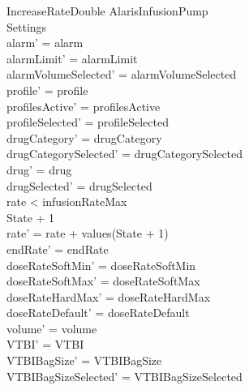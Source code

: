 \begin{schema}{IncreaseRateDouble}
	\Delta AlarisInfusionPump\\
	Settings\\
	\where
	alarm' = alarm\\
	alarmLimit' = alarmLimit\\
	alarmVolumeSelected' = alarmVolumeSelected\\
	profile' = profile\\
	profilesActive' = profilesActive\\  
	\pagebreak
	  profileSelected' = profileSelected\\
	drugCategory' = drugCategory\\ drugCategorySelected' = drugCategorySelected\\
	drug' = drug\\ drugSelected' = drugSelected\\
	rate < infusionRateMax\\
	State + 1 \\
	rate' = rate + values(State + 1)\\
	endRate' = endRate\\
	doseRateSoftMin' = doseRateSoftMin\\
	doseRateSoftMax' = doseRateSoftMax\\
	doseRateHardMax' = doseRateHardMax\\
	doseRateDefault' = doseRateDefault\\
	volume' = volume\\
	VTBI' = VTBI\\
	VTBIBagSize' = VTBIBagSize\\ VTBIBagSizeSelected' = VTBIBagSizeSelected\\

\end{schema}
